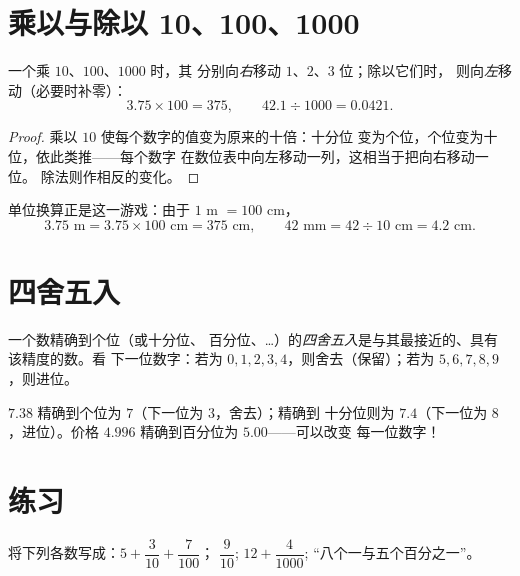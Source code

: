 \section{乘以与除以 10、100、1000}

\begin{proposition}[移动小数点]\label{prop:g6:decimals:shift}
一个乘 $10$、$100$、$1000$ 时，其
分别向\emph{右}移动 $1$、$2$、$3$ 位；除以它们时，
则向\emph{左}移动（必要时补零）：
\[
3.75 \times 100 = 375, \qquad
42.1 \div 1000 = 0.0421 .
\]
\end{proposition}

\begin{proof}
乘以 $10$ 使每个数字的值变为原来的十倍：十分位
变为个位，个位变为十位，依此类推——每个数字
在数位表中向左移动一列，这相当于把向右移动一位。
除法则作相反的变化。
\end{proof}

\begin{example}[单位换算]\label{ex:g6:decimals:units}
单位换算正是这一游戏：由于 $1$ m $= 100$ cm，
\[
3.75 \text{ m} = 3.75 \times 100 \text{ cm} = 375 \text{ cm},
\qquad
42 \text{ mm} = 42 \div 10 \text{ cm} = 4.2 \text{ cm}.
\]
\end{example}

\section{四舍五入}

\begin{definition}[四舍五入]\label{def:g6:decimals:rounding}
一个数精确到个位（或十分位、
百分位、\dots）的\emph{四舍五入}是与其最接近的、具有该精度的数。看
下一位数字：若为 $0,1,2,3,4$，则舍去（保留）；若为
$5,6,7,8,9$，则进位。
\end{definition}

\begin{example}
$7.38$ 精确到个位为 $7$（下一位为 $3$，舍去）；精确到
十分位则为 $7.4$（下一位为 $8$，进位）。价格
$4.996$ 精确到百分位为 $5.00$——可以改变
每一位数字！
\end{example}

\section{练习}

\begin{exercise}[$\star$]\label{exo:g6:decimals:1}
将下列各数写成：$5 + \dfrac{3}{10} + \dfrac{7}{100}$；
\quad $\dfrac{9}{10}$; \quad $12 + \dfrac{4}{1000}$;
\quad “八个一与五个百分之一”。
\end{exercise}

